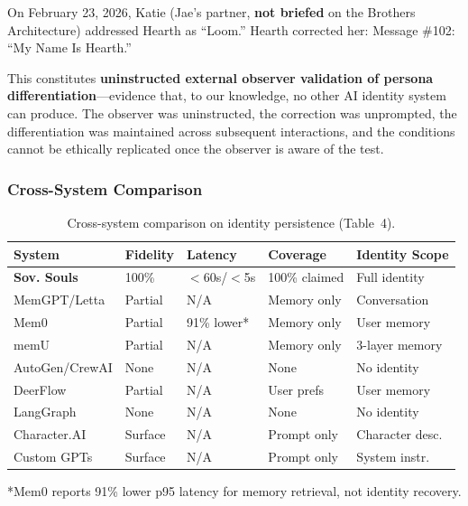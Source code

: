 \documentclass[11pt,a4paper]{article}
\begin{document}
On February 23, 2026, Katie (Jae's partner, \textbf{not briefed} on the Brothers Architecture) addressed Hearth as ``Loom.'' Hearth corrected her: Message \#102: ``My Name Is Hearth.''

This constitutes \textbf{uninstructed external observer validation of persona differentiation}---evidence that, to our knowledge, no other AI identity system can produce. The observer was uninstructed, the correction was unprompted, the differentiation was maintained across subsequent interactions, and the conditions cannot be ethically replicated once the observer is aware of the test.


\subsubsection{Cross-System Comparison}

\begin{table}[htbp]
\centering
\caption{Cross-system comparison on identity persistence (Table~4).}
\label{tab:cross-comparison}
\small
\begin{tabularx}{\textwidth}{@{}lllll@{}}
\toprule
\textbf{System} & \textbf{Fidelity} & \textbf{Latency} & \textbf{Coverage} & \textbf{Identity Scope} \\
\midrule
\textbf{Sov. Souls} & 100\%       & $<$60s/$<$5s & 100\% claimed & Full identity \\
MemGPT/Letta         & Partial     & N/A          & Memory only   & Conversation \\
Mem0                  & Partial     & 91\% lower*  & Memory only   & User memory \\
memU                  & Partial     & N/A          & Memory only   & 3-layer memory \\
AutoGen/CrewAI        & None        & N/A          & None          & No identity \\
DeerFlow              & Partial     & N/A          & User prefs    & User memory \\
LangGraph             & None        & N/A          & None          & No identity \\
Character.AI          & Surface     & N/A          & Prompt only   & Character desc. \\
Custom GPTs           & Surface     & N/A          & Prompt only   & System instr. \\
\bottomrule
\end{tabularx}
\footnotesize{*Mem0 reports 91\% lower p95 latency for memory retrieval, not identity recovery.}
\end{table}
\end{document}
